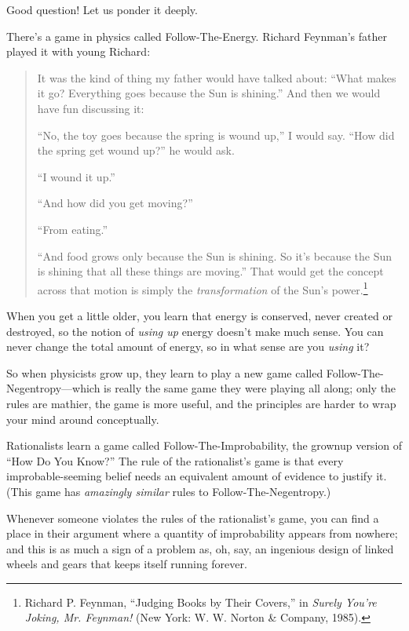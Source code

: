 {
 Good question! Let us ponder it deeply.}

{
 There's a game in physics called
Follow-The-Energy. Richard Feynman's father played it
with young Richard:}

\begin{quotation}
{
 It was the kind of thing my father would have talked about:
``What makes it go? Everything goes because the Sun is
shining.'' And then we would have fun discussing it:}

{
 ``No, the toy goes because the spring is wound
up,'' I would say. ``How did the
spring get wound up?'' he would ask.}

{
 ``I wound it up.''}

{
 ``And how did you get
moving?''}

{
 ``From eating.''}

{
 ``And food grows only because the Sun is shining.
So it's because the Sun is shining that all these
things are moving.'' That would get the concept
across that motion is simply the \textit{transformation} of the
Sun's power.\footnote{Richard P. Feynman, ``Judging Books by Their
Covers,'' in \textit{Surely You're
  Joking, Mr. Feynman!} (New York: W. W. Norton \& Company, 1985).}}
\end{quotation}

{
 When you get a little older, you learn that energy is conserved,
never created or destroyed, so the notion of \textit{using up} energy
doesn't make much sense. You can never change the total
amount of energy, so in what sense are you \textit{using} it?}

{
 So when physicists grow up, they learn to play a new game called
Follow-The-Negentropy---which is really the same game they were playing
all along; only the rules are mathier, the game is more useful, and the
principles are harder to wrap your mind around conceptually.}

{
 Rationalists learn a game called Follow-The-Improbability, the
grownup version of ``How Do You
Know?'' The rule of the rationalist's
game is that every improbable-seeming belief needs an equivalent amount
of evidence to justify it. (This game has \textit{amazingly similar}
rules to Follow-The-Negentropy.)}

{
 Whenever someone violates the rules of the
rationalist's game, you can find a place in their
argument where a quantity of improbability appears from nowhere; and
this is as much a sign of a problem as, oh, say, an ingenious design of
linked wheels and gears that keeps itself running forever.}

